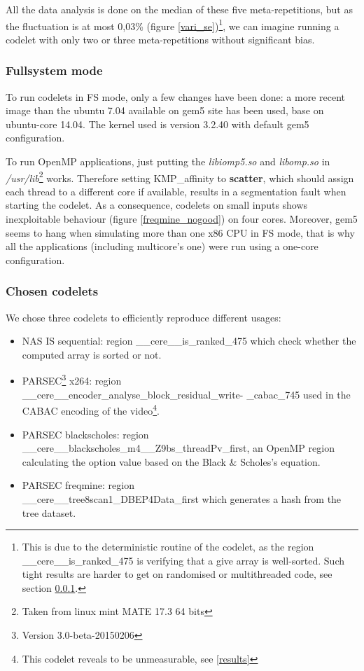 \documentclass{article}
\begin{document}
\begin{multicols}{2}

All the data analysis is done on the median of these five meta-repetitions, but as the fluctuation is at most 0,03\% (figure \ref{vari_se})\footnote{This is due to the deterministic routine of the codelet, as the region \_\_cere\_\_is\_ranked\_475 is verifying that a give array is well-sorted. Such tight results are harder to get on randomised or multithreaded code, see section \ref{FS_mode}.}, we can imagine running a codelet with only two or three meta-repetitions without significant bias.

\subsubsection{Fullsystem mode}
\label{FS_mode}
To run codelets in FS mode, only a few changes have been done: a more recent image than the ubuntu 7.04 available on gem5 site has been used, base on ubuntu-core 14.04. The kernel used is version 3.2.40 with default gem5 configuration.


To run OpenMP applications, just putting the \textit{libiomp5.so} and \textit{libomp.so} in \textit{/usr/lib}\footnote{Taken from linux mint MATE 17.3 64 bits} works. Therefore setting KMP\_affinity to \textbf{scatter}, which should assign each thread to a different core if available, results in a segmentation fault when starting the codelet. As a consequence, codelets on small inputs shows inexploitable behaviour (figure \ref{freqmine_nogood}) on four cores.
 Moreover, gem5 seems to hang when simulating more than one x86 CPU in FS mode, that is why all the applications (including multicore's one) were run using a one-core configuration.


\subsubsection{Chosen codelets}
We chose three codelets to efficiently reproduce different usages:
\begin{itemize}
\item NAS IS sequential: region \_\_cere\_\_is\_ranked\_475 which check whether the computed array is sorted or not.
\item PARSEC\footnote{Version 3.0-beta-20150206} x264: region \\ \_\_cere\_\_encoder\_analyse\_block\_residual\_write- \_cabac\_745 used in the CABAC encoding of the video\footnote{This codelet reveals to be unmeasurable, see \ref{results}}.
\item PARSEC blackscholes: region \\ \_\_cere\_\_blackscholes\_m4\_\_Z9bs\_threadPv\_first, an OpenMP region calculating the option value based on the Black \& Scholes's equation.
\item PARSEC freqmine: region\\ \_\_cere\_\_tree8scan1\_DBEP4Data\_first which generates a hash from the tree dataset.
\end{itemize}


\end{multicols}
\end{document}
